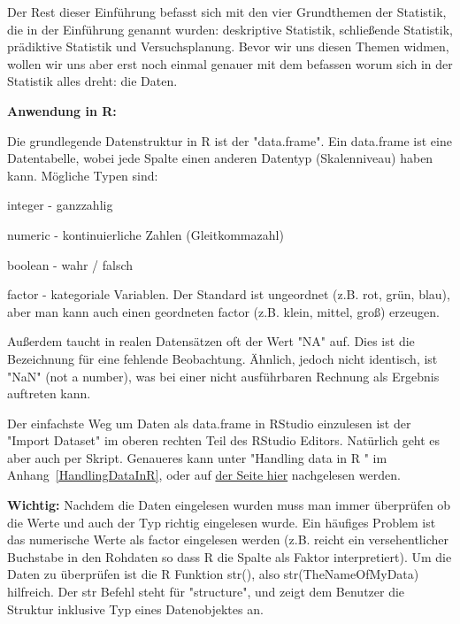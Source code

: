 \documentclass[a4paper,twoside]{tufte-book}\usepackage[]{graphicx}\usepackage[]{color}
\begin{document}
Der Rest dieser Einführung befasst sich mit den vier Grundthemen der Statistik, die in der Einführung genannt wurden: deskriptive Statistik, schließende Statistik, prädiktive Statistik und Versuchsplanung. Bevor wir uns diesen Themen widmen, wollen wir uns aber erst noch einmal genauer mit dem befassen worum sich in der Statistik alles dreht: die Daten.


	
	\vspace{1cm}
	\begin{fullwidth}
\begin{mdframed}[backgroundcolor=black!10,rightline=false,leftline=false]
			
			\textbf{Anwendung in R:} 
			
			Die grundlegende Datenstruktur in R ist der "data.frame". Ein data.frame ist eine Datentabelle, wobei jede Spalte einen anderen Datentyp (Skalenniveau) haben kann. Mögliche Typen sind:
			
			\begin{itemize*}
				\item integer - ganzzahlig
				\item numeric - kontinuierliche Zahlen (Gleitkommazahl)
				\item boolean - wahr / falsch
				\item factor - kategoriale Variablen. Der Standard ist ungeordnet (z.B. rot, grün, blau), aber man kann auch einen geordneten factor (z.B. klein, mittel, groß) erzeugen.
			\end{itemize*}
			
			Außerdem taucht in realen Datensätzen oft der Wert "NA" auf. Dies ist die Bezeichnung für eine fehlende Beobachtung. Ähnlich, jedoch nicht identisch, ist "NaN" (not a number), was bei einer nicht ausführbaren Rechnung als Ergebnis auftreten kann.
			
			Der einfachste Weg um Daten als data.frame in RStudio einzulesen ist der "Import Dataset" im oberen rechten Teil des RStudio Editors. Natürlich geht es aber auch per Skript. Genaueres kann unter "Handling data in R " im Anhang~\ref{HandlingDataInR}, oder auf \href{http://biometry.github.io/APES/R/R20-DataStructures.html}{der Seite hier} nachgelesen werden.
			
			\textbf{Wichtig:} Nachdem die Daten eingelesen wurden muss man immer überprüfen ob die Werte und auch der Typ richtig eingelesen wurde. Ein häufiges Problem ist das numerische Werte als factor eingelesen werden (z.B. reicht ein versehentlicher Buchstabe in den Rohdaten so dass R die Spalte als Faktor interpretiert). Um die Daten zu überprüfen ist die R Funktion str(), also str(TheNameOfMyData) hilfreich. Der str Befehl steht für "structure", und zeigt dem Benutzer die Struktur inklusive Typ eines Datenobjektes an. 			
		\end{mdframed}
	\end{fullwidth}
	
\end{document}
